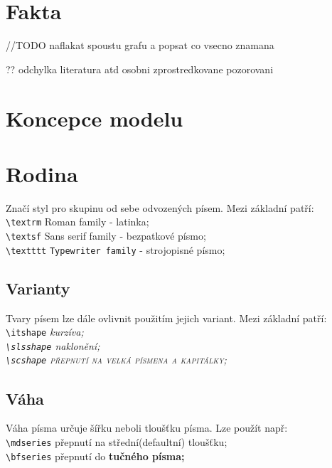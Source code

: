 \documentclass[a4paper, 11pt]{article}
\begin{document}
\section{Fakta}
//TODO naflakat spoustu grafu a popsat co vsecno znamana

?? odchylka
literatura atd 
osobni zprostredkovane pozorovani


\section{Koncepce modelu}




\section{Rodina}
Značí styl pro skupinu od sebe odvozených písem. Mezi základní patří: \\ 
\verb|\textrm| \hspace{0.5cm} \textrm{Roman family} - latinka;\\
\verb|\textsf| \hspace{0.5cm} \textsf{Sans serif family} - bezpatkové písmo;\\
\verb|\textttt| \hspace{0.3cm} \texttt{Typewriter family} - strojopisné písmo;
\cite{latex_kompletni_pruvodce, typograficky_manual}

\subsection{Varianty}
Tvary písem lze dále ovlivnit použitím jejich variant. Mezi základní patří: \\
\verb|\itshape| \hspace{0.5cm} \itshape{kurzíva;} \\
\verb|\slsshape| \hspace{0.28cm} \slshape{naklonění;} \\
\verb|\scshape| \hspace{0.5cm} \scshape přepnutí na velká písmena a kapitálky; \normalfont
\cite{latex_kompletni_pruvodce, typograficky_manual}

\subsection{Váha}
Váha písma určuje šířku neboli tloušťku písma. Lze použít např: \\
\verb|\mdseries| \hspace{0.5cm} přepnutí na střední(defaultní) tloušťku; \\
\verb|\bfseries| \hspace{0.5cm} přepnutí do \bfseries tučného \normalfont písma;
\cite{latex_kompletni_pruvodce, typograficky_manual}
\end{document}
